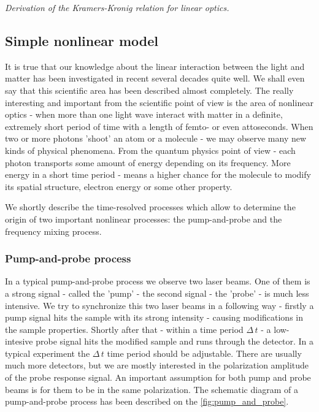 \documentclass[12pt,twoside,a4paper]{article}
\numberwithin{equation}{subsection}
\numberwithin{figure}{subsection}
\begin{document}
\textit{Derivation of the Kramers-Kronig relation for linear optics.}

\subsection{Simple nonlinear model} \label{chap:problem_nlo}

It is true that our knowledge about the linear interaction between the light and matter has been investigated in recent several decades quite
well. We shall even say that this scientific area has been described almost completely. The really interesting and important from the
scientific point of view is the area of nonlinear optics - when more than one light wave interact with matter in a definite, extremely
short period of time with a length of femto- or even attoseconds. When two or more photons 'shoot' an atom or a molecule - we may observe
many new kinds of physical phenomena. From the quantum physics point of view - each photon transports some amount of energy depending on
its frequency. More energy in a short time period - means a higher chance for the molecule to modify its spatial structure, electron
energy or some other property.

We shortly describe the time-resolved processes which allow to determine the origin of two important nonlinear processes: the pump-and-probe and
the frequency mixing process.

\subsubsection*{Pump-and-probe process}

In a typical pump-and-probe process we observe two laser beams. One of them is a strong signal - called the 'pump' - the second signal - the
'probe' - is much less intensive. We try to synchronize this two laser beams in a following way - firstly a pump signal hits the sample with
its strong intensity - causing modifications in the sample properties. Shortly after that - within a time period
$\Delta \, t$ - a low-intesive probe signal hits the modified sample and runs through the detector. In a typical experiment the
$\Delta \, t$ time period should be adjustable. There are usually much more detectors, but we are mostly interested in the polarization amplitude
of the probe response signal. An important assumption for both pump and probe beams is for them to be in the same polarization. The
schematic diagram of a pump-and-probe process has been described on the \ref{fig:pump_and_probe}.
\end{document}
